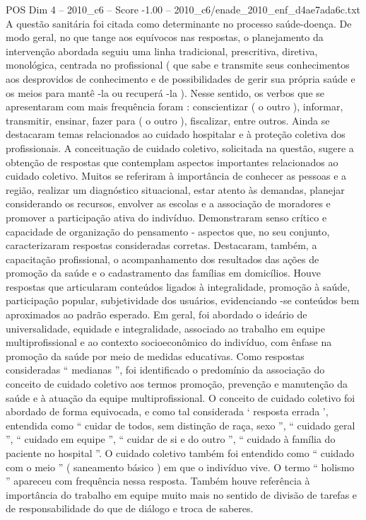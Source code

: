 \begin{textsample}{POS Dim 4 – 2010\_c6 – Score -1.00 – 2010\_c6/enade\_2010\_enf\_d4ae7ada6c.txt}
A questão sanitária foi citada como determinante no processo saúde-doença.
De modo geral, no que tange aos equívocos nas respostas, o planejamento da intervenção abordada seguiu uma linha tradicional, prescritiva, diretiva, monológica, centrada no profissional ( que sabe e transmite seus conhecimentos aos desprovidos de conhecimento e de possibilidades de gerir sua própria saúde e os meios para mantê -la ou recuperá -la ).
Nesse sentido, os verbos que se apresentaram com mais frequência foram : conscientizar ( o outro ), informar, transmitir, ensinar, fazer para ( o outro ), fiscalizar, entre outros.
Ainda se destacaram temas relacionados ao cuidado hospitalar e à proteção coletiva dos profissionais.
A conceituação de cuidado coletivo, solicitada na questão, sugere a obtenção de respostas que contemplam aspectos importantes relacionados ao cuidado coletivo.
Muitos se referiram à importância de conhecer as pessoas e a região, realizar um diagnóstico situacional, estar atento às demandas, planejar considerando os recursos, envolver as escolas e a associação de moradores e promover a participação ativa do indivíduo.
Demonstraram senso crítico e capacidade de organização do pensamento - aspectos que, no seu conjunto, caracterizaram respostas consideradas corretas.
Destacaram, também, a capacitação profissional, o acompanhamento dos resultados das ações de promoção da saúde e o cadastramento das famílias em domicílios.
Houve respostas que articularam conteúdos ligados à integralidade, promoção à saúde, participação popular, subjetividade dos usuários, evidenciando -se conteúdos bem aproximados ao padrão esperado.
Em geral, foi abordado o ideário de universalidade, equidade e integralidade, associado ao trabalho em equipe multiprofissional e ao contexto socioeconômico do indivíduo, com ênfase na promoção da saúde por meio de medidas educativas.
Como respostas consideradas “ medianas ”, foi identificado o predomínio da associação do conceito de cuidado coletivo aos termos promoção, prevenção e manutenção da saúde e à atuação da equipe multiprofissional.
O conceito de cuidado coletivo foi abordado de forma equivocada, e como tal considerada ‘ resposta errada ’, entendida como “ cuidar de todos, sem distinção de raça, sexo ”, “ cuidado geral ”, “ cuidado em equipe ”, “ cuidar de si e do outro ”, “ cuidado à família do paciente no hospital ”.
O cuidado coletivo também foi entendido como “ cuidado com o meio ” ( saneamento básico ) em que o indivíduo vive.
O termo “ holismo ” apareceu com frequência nessa resposta.
Também houve referência à importância do trabalho em equipe muito mais no sentido de divisão de tarefas e de responsabilidade do que de diálogo e troca de saberes.

\end{textsample}
